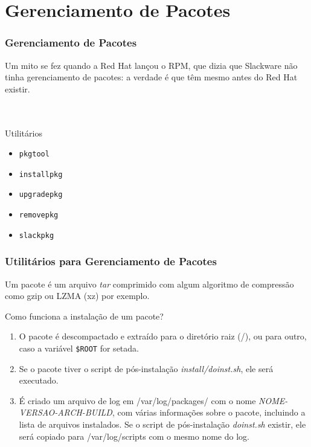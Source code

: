 \documentclass[aspectratio=169]{beamer}
\begin{document}
\section{Gerenciamento de Pacotes}
\begin{frame}
	\frametitle{Gerenciamento de Pacotes}
	Um mito se fez quando a Red Hat lançou o RPM, que dizia que Slackware
	não tinha gerenciamento de pacotes: a verdade é que têm mesmo antes
	do Red Hat existir.
	~\\
	~\\
	~\\
	\begin{block}{Utilitários}
		\begin{itemize}
			\item \texttt{pkgtool}
			\item \texttt{installpkg}
			\item \texttt{upgradepkg}
			\item \texttt{removepkg}
			\item \texttt{slackpkg}
		\end{itemize}
	\end{block}
\end{frame}

\begin{frame}
	\frametitle{Utilitários para Gerenciamento de Pacotes}
	Um pacote é um arquivo \textit{tar} comprimido com algum algoritmo de compressão
	como gzip ou LZMA (xz) por exemplo.\\

	\begin{block}{Como funciona a instalação de um pacote?}
	\begin{enumerate}
		\item O pacote é descompactado e extraído para o diretório raiz (/),
			ou para outro, caso a variável \texttt{\$ROOT} for
			setada.
		\item Se o pacote tiver o script de pós-instalação \textit{install/doinst.sh},
			ele será executado.
		\item É criado um arquivo de log em /var/log/packages/ com o nome 
			\small{\textit{NOME-VERSAO-ARCH-BUILD}}, com várias informações sobre o
			pacote, incluindo a lista de arquivos instalados. Se o script
			de pós-instalação \textit{doinst.sh} existir, ele será copiado
			para /var/log/scripts com o mesmo nome do log.
	\end{enumerate}
	\end{block}
\end{frame}
\end{document}
